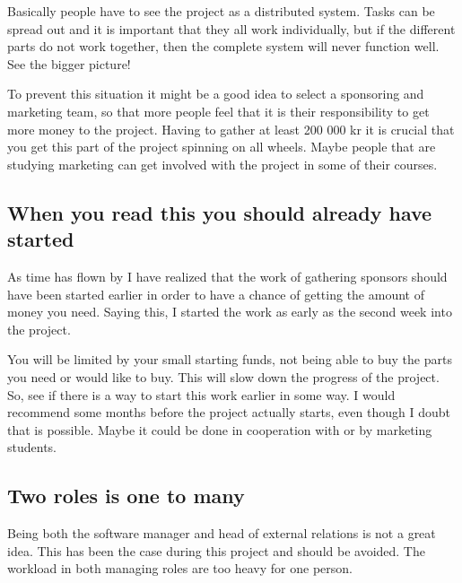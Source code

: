 Basically people have to see the project as a distributed system. Tasks can be spread out and it is important that they all work individually, but if the different parts do not work together, then the complete system will never function well. See the bigger picture! 

To prevent this situation it might be a good idea to select a sponsoring and marketing team, so that more people feel that it is their responsibility to get more money to the project. Having to gather at least 200 000 kr it is crucial that you get this part of the project spinning on all wheels. Maybe people that are studying marketing can get involved with the project in some of their courses. 

\subsection{When you read this you should already have started}
As time has flown by I have realized that the work of gathering sponsors should have been started earlier in order to have a chance of getting the amount of money you need. Saying this, I started the work as early as the second week into the project. 

You will be limited by your small starting funds, not being able to buy the parts you need or would like to buy. This will slow down the progress of the project. So, see if there is a way to start this work earlier in some way. I would recommend some months before the project actually starts, even though I doubt that is possible. Maybe it could be done in cooperation with or by marketing students.

\subsection{Two roles is one to many}
Being both the software manager and head of external relations is not a great idea. This has been the case during this project and should be avoided. The workload in both managing roles are too heavy for one person.